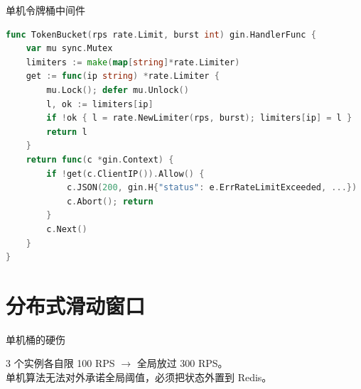 \begin{frame}[fragile]{单机令牌桶中间件}
\begin{lstlisting}[language=Go,firstnumber=22,
  caption={\srcnote{middleware/ratelimit.go:22--49}}]
func TokenBucket(rps rate.Limit, burst int) gin.HandlerFunc {
    var mu sync.Mutex
    limiters := make(map[string]*rate.Limiter)
    get := func(ip string) *rate.Limiter {
        mu.Lock(); defer mu.Unlock()
        l, ok := limiters[ip]
        if !ok { l = rate.NewLimiter(rps, burst); limiters[ip] = l }
        return l
    }
    return func(c *gin.Context) {
        if !get(c.ClientIP()).Allow() {
            c.JSON(200, gin.H{"status": e.ErrRateLimitExceeded, ...})
            c.Abort(); return
        }
        c.Next()
    }
}
\end{lstlisting}
\end{frame}

\section{分布式滑动窗口}

\begin{frame}{单机桶的硬伤}
\vspace{2mm}
\small 3 个实例各自限 100 RPS $\to$ 全局放过 300 RPS。\\
单机算法无法对外承诺全局阈值，必须把状态外置到 Redis。
\end{frame}

